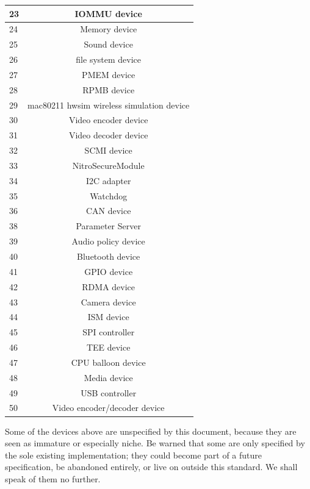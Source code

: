 \begin{longtable} { |l|c| }
\hline
23         &   IOMMU device \\
\hline
24         &   Memory device \\
\hline
25         &   Sound device \\
\hline
26         &   file system device \\
\hline
27         &   PMEM device \\
\hline
28         &   RPMB device \\
\hline
29         &   mac80211 hwsim wireless simulation device \\
\hline
30         &   Video encoder device \\
\hline
31         &   Video decoder device \\
\hline
32         &   SCMI device \\
\hline
33         &   NitroSecureModule \\
\hline
34         &   I2C adapter \\
\hline
35         &   Watchdog \\
\hline
36         &   CAN device \\
\hline
38         &   Parameter Server \\
\hline
39         &   Audio policy device \\
\hline
40         &   Bluetooth device \\
\hline
41         &   GPIO device \\
\hline
42         &   RDMA device \\
\hline
43         &   Camera device \\
\hline
44         &   ISM device \\
\hline
45         &   SPI controller \\
\hline
46         &   TEE device \\
\hline
47         &   CPU balloon device \\
\hline
48         &   Media device \\
\hline
49         &   USB controller \\
\hline
50         &   Video encoder/decoder device \\
\hline
\end{longtable}

Some of the devices above are unspecified by this document,
because they are seen as immature or especially niche.  Be warned
that some are only specified by the sole existing implementation;
they could become part of a future specification, be abandoned
entirely, or live on outside this standard.  We shall speak of
them no further.

